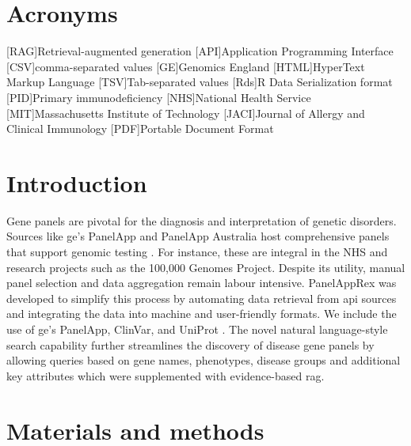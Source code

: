 \section*{Acronyms}
\renewenvironment{description} %
{\list{}{\labelwidth0pt\itemindent-\leftmargin
    \parsep-1em\itemsep0pt\let\makelabel\descriptionlabel}}
               {\endlist}
\begin{acronym} 
[RAG]{Retrieval-augmented generation}
[API]{Application Programming Interface}
[CSV]{comma-separated values}
[GE]{Genomics England}
[HTML]{HyperText Markup Language}
[TSV]{Tab-separated values}
[Rds]{R Data Serialization format}
[PID]{Primary immunodeficiency}
[NHS]{National Health Service}
[MIT]{Massachusetts Institute of Technology}
[JACI]{Journal of Allergy and Clinical Immunology}
[PDF]{Portable Document Format}

 \end{acronym} 
 
 
\section{Introduction}
\noindent
Gene panels are pivotal for the diagnosis and interpretation of genetic disorders. Sources like \ac{ge}’s PanelApp and PanelApp Australia host comprehensive panels that support genomic testing \cite{martin_panelapp_2019}. 
For instance, these are integral in the NHS and research projects such as the 100,000 Genomes Project\cite{martin_panelapp_2019}. Despite its utility, manual panel selection and data aggregation remain labour intensive. PanelAppRex was developed to simplify this process by automating data retrieval from \ac{api} sources and integrating the data into machine and user-friendly formats. We include the use of \ac{ge}’s PanelApp, ClinVar, and UniProt
\cite{martin_panelapp_2019,
landrum_clinvar_2018, the_uniprot_consortium_uniprot_2025}. 
The novel natural language-style search capability further streamlines the discovery of disease gene panels by allowing queries based on gene names, phenotypes, disease groups and additional key attributes which were supplemented with evidence-based \ac{rag}.

\section{Materials and methods}
